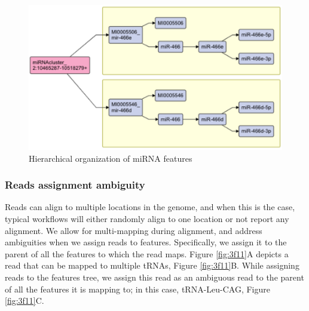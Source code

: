 \documentclass[12pt,twoside]{reedthesis}
\begin{document}
\begin{figure}[htbp]

{\centering \includegraphics{thesis_files/figure-latex/3f10-1} 

}

\caption{Hierarchical organization of miRNA features}\label{fig:3f10}
\end{figure}
\hypertarget{reads-assignment-ambiguity}{%
\subsubsection{Reads assignment ambiguity}\label{reads-assignment-ambiguity}}

Reads can align to multiple locations in the genome, and when this is
the case, typical workflows will either randomly align to one location
or not report any alignment. We allow for multi-mapping during
alignment, and address ambiguities when we assign reads to features.
Specifically, we assign it to the parent of all the features to which
the read maps. Figure \ref{fig:3f11}A depicts a read that can be mapped
to multiple tRNAs, Figure \ref{fig:3f11}B. While assigning reads to the
features tree, we assign this read as an ambiguous read to the parent of
all the features it is mapping to; in this case, tRNA-Leu-CAG, Figure
\ref{fig:3f11}C.
\end{document}
